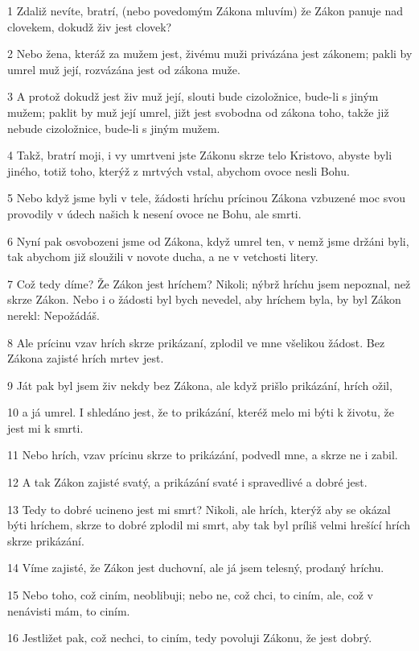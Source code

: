 \par 1 Zdaliž nevíte, bratrí, (nebo povedomým Zákona mluvím) že Zákon panuje nad clovekem, dokudž živ jest clovek?
\par 2 Nebo žena, kteráž za mužem jest, živému muži privázána jest zákonem; pakli by umrel muž její, rozvázána jest od zákona muže.
\par 3 A protož dokudž jest živ muž její, slouti bude cizoložnice, bude-li s jiným mužem; paklit by muž její umrel, jižt jest svobodna od zákona toho, takže již nebude cizoložnice, bude-li s jiným mužem.
\par 4 Takž, bratrí moji, i vy umrtveni jste Zákonu skrze telo Kristovo, abyste byli jiného, totiž toho, kterýž z mrtvých vstal, abychom ovoce nesli Bohu.
\par 5 Nebo když jsme byli v tele, žádosti hríchu prícinou Zákona vzbuzené moc svou provodily v údech našich k nesení ovoce ne Bohu, ale smrti.
\par 6 Nyní pak osvobozeni jsme od Zákona, když umrel ten, v nemž jsme držáni byli, tak abychom již sloužili v novote ducha, a ne v vetchosti litery.
\par 7 Což tedy díme? Že Zákon jest hríchem? Nikoli; nýbrž hríchu jsem nepoznal, než skrze Zákon. Nebo i o žádosti byl bych nevedel, aby hríchem byla, by byl Zákon nerekl: Nepožádáš.
\par 8 Ale prícinu vzav hrích skrze prikázaní, zplodil ve mne všelikou žádost. Bez Zákona zajisté hrích mrtev jest.
\par 9 Ját pak byl jsem živ nekdy bez Zákona, ale když prišlo prikázání, hrích ožil,
\par 10 a já umrel. I shledáno jest, že to prikázání, kteréž melo mi býti k životu, že jest mi k smrti.
\par 11 Nebo hrích, vzav prícinu skrze to prikázání, podvedl mne, a skrze ne i zabil.
\par 12 A tak Zákon zajisté svatý, a prikázání svaté i spravedlivé a dobré jest.
\par 13 Tedy to dobré ucineno jest mi smrt? Nikoli, ale hrích, kterýž aby se okázal býti hríchem, skrze to dobré zplodil mi smrt, aby tak byl príliš velmi hrešící hrích skrze prikázání.
\par 14 Víme zajisté, že Zákon jest duchovní, ale já jsem telesný, prodaný hríchu.
\par 15 Nebo toho, což ciním, neoblibuji; nebo ne, což chci, to ciním, ale, což v nenávisti mám, to ciním.
\par 16 Jestližet pak, což nechci, to ciním, tedy povoluji Zákonu, že jest dobrý.
